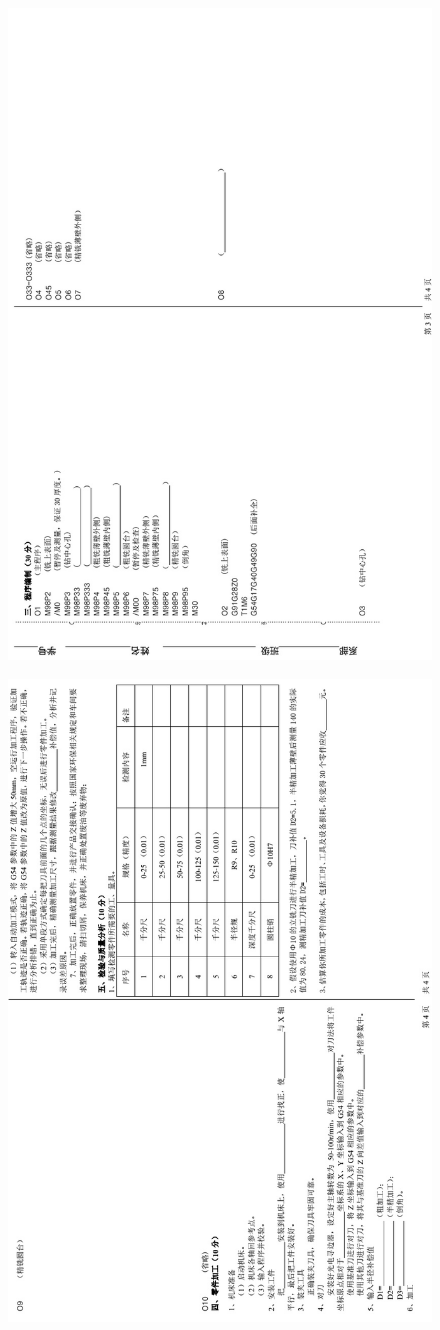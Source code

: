 \documentclass[a4paper,12pt]{article}
\numberwithin{table}{section}
\numberwithin{figure}{section}
\begin{document}
\begin{figure}[!h]
	\centering	
	\includegraphics[height=\textwidth,angle=90]{images/shijuan3}
\end{figure}
\begin{figure}[!h]
	\centering	
	\includegraphics[height=\textwidth,angle=90]{images/shijuan4}
\end{figure}
\end{document}
